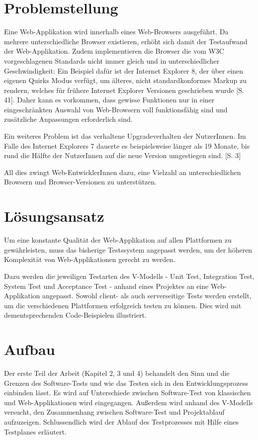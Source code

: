 \documentclass[a4paper,bibtotoc,oneside]{scrbook}
\begin{document}
\section{Problemstellung}
Eine Web-Applikation wird innerhalb eines Web-Browsers ausgeführt. Da mehrere unterschiedliche Browser existieren, erhöht sich damit der Testaufwand der Web-Applikation. Zudem implementieren die Browser die vom W3C vorgeschlagenen Standards nicht immer gleich und in unterschiedlicher Geschwindigkeit: Ein Beispiel dafür ist der Internet Explorer 8, der über einen eigenen Quirks Modus verfügt, um älteres, nicht standardkonformes Markup zu rendern, welches für frühere Internet Explorer Versionen geschrieben wurde \cite{iexpl}[S. 41]. Daher kann es vorkommen, dass gewisse Funktionen nur in einer eingeschränkten Auswahl von Web-Browsern voll funktionsfähig sind und zusätzliche Anpassungen erforderlich sind. \cite{caniuse}

Ein weiteres Problem ist das verhaltene Upgradeverhalten der NutzerInnen. Im Falle des Internet Explorers 7 dauerte es beispielsweise länger als 19 Monate, bis rund die Hälfte der NutzerInnen auf die neue Version umgestiegen sind. \cite{insecure}[S. 3]

All dies zwingt Web-EntwicklerInnen dazu, eine Vielzahl an unterschiedlichen Browsern und Browser-Versionen zu unterstützen.

\section{Lösungsansatz}
Um eine konstante Qualität der Web-Applikation auf allen Plattformen zu gewährleisten, muss das bisherige Testssystem angepasst werden, um der höheren Komplexität von Web-Applikationen gerecht zu werden.

Dazu werden die jeweiligen Testarten des V-Modells - Unit Test, Integration Test, System Test und Acceptance Test - anhand eines Projektes an eine Web-Applikation angepasst. Sowohl client- als auch serverseitige Tests werden erstellt, um die verschiedenen Plattformen erfolgreich testen zu können. Dies wird mit dementsprechenden Code-Beispielen illustriert.

\section{Aufbau}
Der erste Teil der Arbeit (Kapitel 2, 3 und 4) behandelt den Sinn und die Grenzen des Software-Tests und wie das Testen sich in den Entwicklungsprozess einbinden lässt. Es wird auf Unterschiede zwischen Software-Test von klassischen und Web-Applikationen wird eingegangen. Außerdem wird anhand des V-Modells versucht, den Zusammenhang zwischen Software-Test und Projektablauf aufzuzeigen. Schlussendlich wird der Ablauf des Testprozesses mit Hilfe eines Testplanes erläutert.
\end{document}
